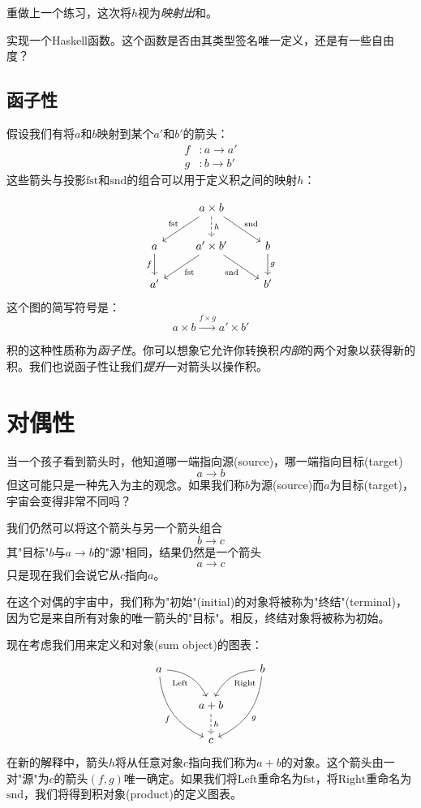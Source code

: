 \documentclass[DaoFP]{subfiles}
\begin{document}
\begin{exercise}
重做上一个练习，这次将$h$视为\emph{映射出}和。
\end{exercise}

\begin{exercise}
实现一个Haskell函数。这个函数是否由其类型签名唯一定义，还是有一些自由度？
\end{exercise}

\subsection{函子性}

假设我们有将$a$和$b$映射到某个$a'$和$b'$的箭头：
\begin{align*}
f &\colon a \to a' \\
g &\colon b \to b'
\end{align*}
这些箭头与投影$\text{fst}$和$\text{snd}$的组合可以用于定义积之间的映射$h$：

\[
 \begin{tikzcd}
 & a \times b
\arrow[d, dashed, "h"]
 \arrow[dl,  "\text{fst}"']
 \arrow[dr,   "\text{snd}"]
\\
a
\arrow[d, "f"']
&a' \times b'
 \arrow[dl,  "\text{fst}"]
  \arrow[dr,   "\text{snd}"']
& b
\arrow[d, "g"]
\\
a' && b'
 \end{tikzcd}
\]
这个图的简写符号是：
\[ a \times b \xrightarrow{f \times g} a' \times b' \]

积的这种性质称为\emph{函子性}。你可以想象它允许你转换积\emph{内部}的两个对象以获得新的积。我们也说函子性让我们\emph{提升}一对箭头以操作积。

\section{对偶性}

当一个孩子看到箭头时，他知道哪一端指向源(source)，哪一端指向目标(target)
\[a \to b \]
但这可能只是一种先入为主的观念。如果我们称$b$为源(source)而$a$为目标(target)，宇宙会变得非常不同吗？

我们仍然可以将这个箭头与另一个箭头组合
\[b \to c\]
其"目标"$b$与$a \to b$的"源"相同，结果仍然是一个箭头
\[a \to c\]
只是现在我们会说它从$c$指向$a$。

在这个对偶的宇宙中，我们称为"初始"(initial)的对象将被称为"终结"(terminal)，因为它是来自所有对象的唯一箭头的"目标"。相反，终结对象将被称为初始。

现在考虑我们用来定义和对象(sum object)的图表：
\[
 \begin{tikzcd}
 a
 \arrow[dr,  bend left, "\text{Left}"']
 \arrow[ddr, bend right, "f"']
 && b
 \arrow[dl, bend right, "\text{Right}"]
 \arrow[ddl, bend left, "g"]
 \\
&a + b
\arrow[d, dashed, "h"]
\\
& c
 \end{tikzcd}
\]
在新的解释中，箭头$h$将从任意对象$c$指向我们称为$a + b$的对象。这个箭头由一对"源"为$c$的箭头$(f, g)$唯一确定。如果我们将$\text{Left}$重命名为$\text{fst}$，将$\text{Right}$重命名为$\text{snd}$，我们将得到积对象(product)的定义图表。
\end{document}
